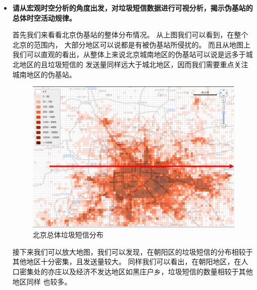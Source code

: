 \documentclass[12pt,a4paper]{article}
\begin{document}
\begin{itemize}
	\item \textbf{请从宏观时空分析的角度出发，对垃圾短信数据进行可视分析，揭示伪基站的总体时空活动规律。}
	
	首先我们来看看北京伪基站的整体分布情况。
	从上图我们可以看到，在整个北京的范围内，
	大部分地区可以说都是有被伪基站所侵扰的。
	而且从地图上我们可以直观的看出，从整体上来说北京城南地区的伪基站可以说是远多于城北地区的且垃圾短信的
	发送量同样远大于城北地区，因而我们需要重点关注
	城南地区的伪基站。

	\begin{flushleft}
		\begin{figure}[H]
			\centering
				\includegraphics[width=\linewidth]{pic4.png}
				\caption{北京总体垃圾短信分布}
		\end{figure}
	\end{flushleft}

	接下来我们可以放大地图，我们可以发现，在朝阳区的垃圾短信的分布相较于其他地区十分密集，且发送量较大。
	同样我们可以看出，在朝阳地区，在人口密集处的亦庄以及经济不发达地区如黑庄户乡，垃圾短信的数量相较于其他地区同样
	也较多。


\end{itemize}
\end{document}
